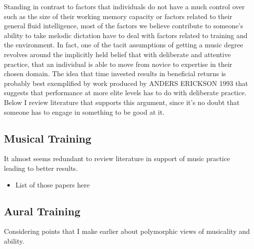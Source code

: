 \documentclass[]{book}
\providecommand{\tightlist}{%
  \setlength{\itemsep}{0pt}\setlength{\parskip}{0pt}}
\theoremstyle{definition}
\theoremstyle{definition}
\theoremstyle{definition}
\theoremstyle{remark}
\begin{document}
Standing in contrast to factors that individuals do not have a much
control over such as the size of their working memory capacity or
factors related to their general fluid intelligence, most of the factors
we believe contribute to someone's ability to take melodic dictation
have to deal with factors related to training and the environment. In
fact, one of the tacit assumptions of getting a music degree revolves
around the implicitly held belief that with deliberate and attentive
practice, that an individual is able to move from novice to expertise in
their chosen domain. The idea that time invested results in beneficial
returns is probably best exemplified by work produced by ANDERS ERICKSON
1993 that suggests that performance at more elite levels has to do with
deliberate practice. Below I review literature that supports this
argument, since it's no doubt that someone has to engage in something to
be good at it.

\hypertarget{musical-training}{%
\subsection{Musical Training}\label{musical-training}}

It almost seems redundant to review literature in support of music
practice leading to better results.

\begin{itemize}
\tightlist
\item
  List of those papers here
\end{itemize}

\hypertarget{aural-training}{%
\subsection{Aural Training}\label{aural-training}}

Considering points that I make earlier about polymorphic views of
musicality and ability.
\end{document}
